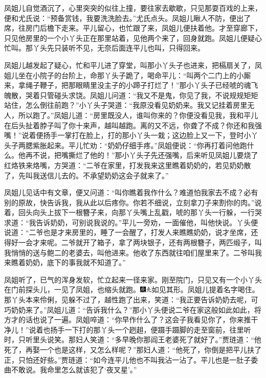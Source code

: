 凤姐儿自觉酒沉了，心里突突的似往上撞，要往家去歇歇，只见那耍百戏的上来，便和尤氏说：``预备赏钱，我要洗洗脸去。''尤氏点头。凤姐儿瞅人不防，便出了席，往房门后檐下走来。平儿留心，也忙跟了来，凤姐儿便扶着他。才至穿廊下，只见他房里的一个小丫头正在那里站着，见他两个来了，回身就跑。凤姐儿便疑心忙叫。那丫头先只装听不见，无奈后面连平儿也叫，只得回来。

凤姐儿越发起了疑心，忙和平儿进了穿堂，叫那小丫头子也进来，把槅扇关了，凤姐儿坐在小院子的台阶上，命那丫头子跪了，喝命平儿：``叫两个二门上的小厮来，拿绳子鞭子，把那眼睛里没主子的小蹄子打烂了！''那小丫头子已经唬的魂飞魄散，哭着只管碰头求饶。凤姐儿问道：``我又不是鬼，你见了我，不说规规矩矩站住，怎么倒往前跑？''小丫头子哭道：``我原没看见奶奶来。我又记挂着房里无人，所以跑了。''凤姐儿道：``房里既没人，谁叫你来的？你便没看见我，我和平儿在后头扯着脖子叫了你十来声，越叫越跑。离的又不远，你聋了不成？你还和我强嘴！''说着便扬手一掌打在脸上，打的那小丫头一栽；这边脸上又一下，登时小丫头子两腮紫胀起来。平儿忙劝：``奶奶仔细手疼。''凤姐便说：``你再打着问他跑什么。他再不说，把嘴撕烂了他的！''那小丫头子先还强嘴，后来听见凤姐儿要烧了红烙铁来烙嘴，方哭道：``二爷在家里，打发我来这里瞧着奶奶的，若见奶奶散了，先叫我送信儿去的。不承望奶奶这会子就来了。''

凤姐儿见话中有文章，便又问道：``叫你瞧着我作什么？难道怕我家去不成？必有别的原故，快告诉我，我从此以后疼你。你若不细说，立刻拿刀子来割你的肉。''说着，回头向头上拔下一根簪子来，向那丫头嘴上乱戳，唬的那丫头一行躲，一行哭求道：``我告诉奶奶，可别说我说的。''平儿一旁劝，一面催他，叫他快说。丫头便说道：``二爷也是才来房里的，睡了一会醒了，打发人来瞧瞧奶奶，说才坐席，还得好一会才来呢。二爷就开了箱子，拿了两块银子，还有两根簪子，两匹缎子，叫我悄悄的送与鲍二的老婆去，叫他进来。他收了东西就往咱们屋里来了。二爷叫我来瞧着奶奶，底下的事我就不知道了。''

凤姐听了，已气的浑身发软，忙立起来一径来家。刚至院门，只见又有一个小丫头在门前探头儿，一见了凤姐，也缩头就跑。{\includegraphics[width=3mm]{../Images/00004}\includegraphics[width=3mm]{../Images/00012}\footnotesize \kaishu 如见其形。}凤姐儿提着名字喝住。那丫头本来伶俐，见躲不过了，越性跑了出来，笑道：``我正要告诉奶奶去呢，可巧奶奶来了。''凤姐儿道：``告诉我什么？''那小丫头便说二爷在家这般如此如此，将方才的话也说了一遍。凤姐啐道：``你早作什么了？这会子我看见你了，你来推干净儿！''说着也扬手一下打的那丫头一个趔趄，便蹑手蹑脚的走至窗前，往里听时，只听里头说笑。那妇人笑道：``多早晚你那阎王老婆死了就好了。''贾琏道：``他死了，再娶一个也是这样，又怎么样呢？''那妇人道：``他死了，你倒是把平儿扶了正，只怕还好些。''贾琏道：``如今连平儿他也不叫我沾一沾了。平儿也是一肚子委曲不敢说。我命里怎么就该犯了`夜叉星'。''

